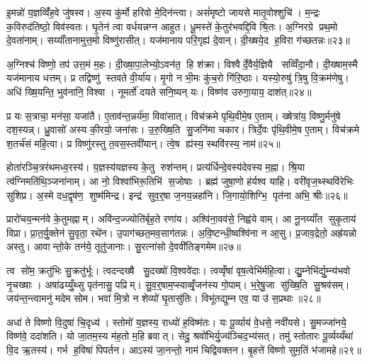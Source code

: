 इ॒मन्नो॑ य॒ज्ञव्विँ॑ह॒वे जु॑षस्व। अ॒स्य कु॑र्मो हरिवो मे॒दिन॑न्त्वा। असं॑मृष्टो जायसे मातृ॒वोश्शुचि॑। म॒न्द्रः क॒विरुद॑तिष्ठो॒ विव॑स्वतः। घृ॒तेन॑ त्वा वर्धयन्नग्न आहुत। धू॒मस्ते॑ के॒तुर॑भवद्दि॒वि श्रि॒तः। अ॒ग्निरग्रे प्रथ॒मो दे॒वता॑नाम्। सय्याँ॑तानामुत्त॒मो विष्णु॑रासीत्। यज॑मानाय परि॒गृह्य॑ दे॒वान्। दी॒ख्षये॒द ह॒विरा ग॑च्छतन्नः॥२३॥

अ॒ग्निश्च॑ विष्णो॒ तप॑ उत्त॒मं म॒हः। दी॒ख्षा॒पा॒लेभ्यो॒ऽवन॑त॒ हि श॑क्रा। विश्वैर्दे॒वैर्य॒ज्ञियै सव्विँदा॒नौ। दी॒ख्षाम॒स्मै यज॑मानाय धत्तम्। प्र तद्विष्णु॑ स्तवते वी॒र्या॑य। मृ॒गो न भी॒मः कु॑च॒रो गि॑रि॒ष्ठाः। यस्यो॒रुषु॑ त्रि॒षु वि॒क्रम॑णेषु। अधि॑ ख्षि॒यन्ति॒ भुव॑नानि॒ विश्वा। नूमर्तो॑ दयते सनि॒ष्यन् यः। विष्ण॑व उरुगा॒याय॒ दाश॑त्॥२४॥

प्र यः स॒त्राचा॒ मन॑सा॒ यजा॑तै। ए॒ताव॑न्त॒न्नर्य॑मा॒ विवा॑सात्। विच॑क्रमे पृथि॒वीमे॒ष ए॒ताम्। ख्षेत्रा॑य॒ विष्णु॒र्मनु॑षे दश॒स्यन्न्। ध्रु॒वासो॑ अस्य की॒रयो॒ जना॑सः। उ॒रु॒ख्षि॒ति सु॒जनि॑मा चकार। त्रिर्दे॒वः पृ॑थि॒वीमे॒ष ए॒ताम्। विच॑क्रमे श॒तर्च॑सं महि॒त्वा। प्र विष्णु॑रस्तु त॒वस॒स्तवी॑यान्। त्वे॒ष ह्य॑स्य॒ स्थवि॑रस्य॒ नाम॑॥२५॥

होता॑रञ्चि॒त्रर॑थमध्व॒रस्य॑। य॒ज्ञस्य॑यज्ञस्य के॒तु रुश॑न्तम्। प्रत्य॑र्धिन्दे॒वस्य॑देवस्य म॒ह्ना। श्रि॒या त्व॑ग्निमति॑थि॒ञ्जना॑नाम्। आ नो॒ विश्वा॑भिरू॒तिभि॑ स॒जोषाः। ब्रह्म॑ जुषा॒णो ह॑र्यश्व याहि। वरी॑वृज॒थ्स्थवि॑रेभिः सुशिप्र। अ॒स्मे दध॒द्वृष॑ण॒ शुष्म॑मिन्द्र। इन्द्र॑ सुव॒र्॒षा ज॒नय॒न्नहा॑नि। जि॒गायो॒शिग्भि॒ पृत॑ना अभि॒ श्रीः॥२६॥

प्रारो॑चय॒न्मन॑वे के॒तुमह्नाम्। अवि॑न्द॒ज्ज्योति॑र्बृह॒ते रणा॑य। अश्वि॑ना॒वव॑से॒ निह्व॑ये वाम्। आ नू॒नय्याँ॑त सुकृ॒ताय॑ विप्रा। प्रा॒त॒र्यु॒क्तेन॑ सु॒वृता॒ रथे॑न। उ॒पाग॑च्छत॒मव॒साग॑तन्नः। अ॒वि॒ष्टन्धी॒ष्वश्वि॑ना न आ॒सु। प्र॒जाव॒द्रेतो॒ अह्र॑यन्नो अस्तु। आवान्तो॒के तन॑ये॒ तूतु॑जानाः। सु॒रत्ना॑सो दे॒ववी॑तिङ्गमेम॥२७॥

त्व सो॑म॒ क्रतु॑भिः सु॒क्रतु॑र्भूः। त्वदन्दख्षै सु॒दख्षो॑ वि॒श्ववे॑दाः। त्वव्वृँषा॑ वृष॒त्वेभि॑र्महि॒त्वा। द्यु॒म्नेभि॑र्द्यु॒म्न्य॑भवो नृ॒चख्षाः। अषा॑ढय्युँ॒थ्सु पृत॑नासु॒ पप्रिम्। सु॒व॒र्॒षाम॒प्स्वाव्वृँ॒जन॑स्य गो॒पाम्। भ॒रे॒षु॒जा सु॑ख्षि॒ति सु॒श्रव॑सम्। जय॑न्त॒न्त्वामनु॑ मदेम सोम। भवा॑ मि॒त्रो न शेव्यो॑ घृ॒तासु॑तिः। विभू॑तद्युम्न एव॒ या उ॑ स॒प्रथाः॥२८॥

अधा॑ ते विष्णो वि॒दुषा॑ चि॒दृध्य॑। स्तोमो॑ य॒ज्ञस्य॒ राध्यो॑ ह॒विष्म॑तः। यः पू॒र्व्याय॑ वे॒धसे॒ नवी॑यसे। सु॒मज्जा॑नये॒ विष्ण॑वे॒ ददा॑शति। यो जा॒तम॒स्य म॑ह॒तो म॒हि ब्रवात्। सेदु॒ श्रवो॑भिर्यु॒ज्य॑ञ्चिद॒भ्य॑सत्। तमु॑ स्तोतारः पू॒र्व्यय्यँथा॑ वि॒द ऋ॒तस्य॑। गर्भ ह॒विषा॑ पिपर्तन। आऽस्य॑ जा॒नन्तो॒ नाम॑ चिद्विवक्तन। बृ॒हत्ते॑ विष्णो सुम॒तिं भ॑जामहे॥२९॥

